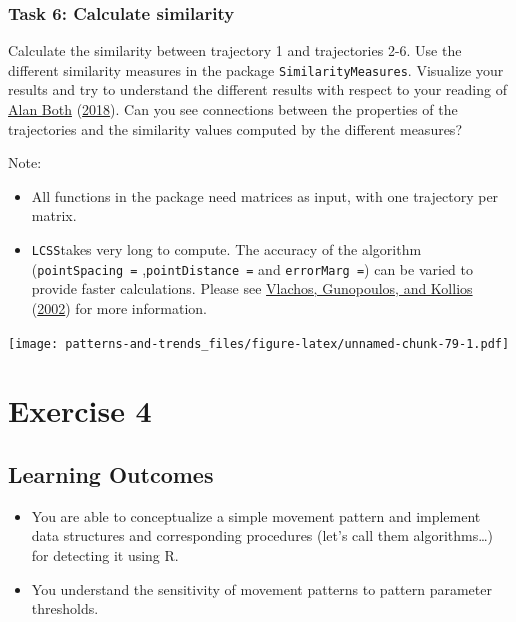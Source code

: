 \documentclass[
]{book}
\providecommand{\tightlist}{%
  \setlength{\itemsep}{0pt}\setlength{\parskip}{0pt}}
\begin{document}
\hypertarget{task-6-calculate-similarity}{%
\subsection{Task 6: Calculate similarity}\label{task-6-calculate-similarity}}

Calculate the similarity between trajectory 1 and trajectories 2-6. Use the different similarity measures in the package \texttt{SimilarityMeasures}. Visualize your results and try to understand the different results with respect to your reading of \protect\hyperlink{ref-both2018}{Alan Both} (\protect\hyperlink{ref-both2018}{2018}). Can you see connections between the properties of the trajectories and the similarity values computed by the different measures?

Note:

\begin{itemize}
\tightlist
\item
  All functions in the package need matrices as input, with one trajectory per matrix.
\item
  \texttt{LCSS}takes very long to compute. The accuracy of the algorithm (\texttt{pointSpacing\ =} ,\texttt{pointDistance\ =} and \texttt{errorMarg\ =}) can be varied to provide faster calculations. Please see \protect\hyperlink{ref-vlachos2002}{Vlachos, Gunopoulos, and Kollios} (\protect\hyperlink{ref-vlachos2002}{2002}) for more information.
\end{itemize}

\texttt{[image: patterns-and-trends\_files/figure-latex/unnamed-chunk-79-1.pdf]}

\hypertarget{exercise-4}{%
\chapter{Exercise 4}\label{exercise-4}}

\hypertarget{learning-outcomes-3}{%
\section{Learning Outcomes}\label{learning-outcomes-3}}

\begin{itemize}
\tightlist
\item
  You are able to conceptualize a simple movement pattern and implement data structures and corresponding procedures (let's call them algorithms\ldots) for detecting it using R.
\item
  You understand the sensitivity of movement patterns to pattern parameter thresholds.
\end{itemize}
\end{document}
